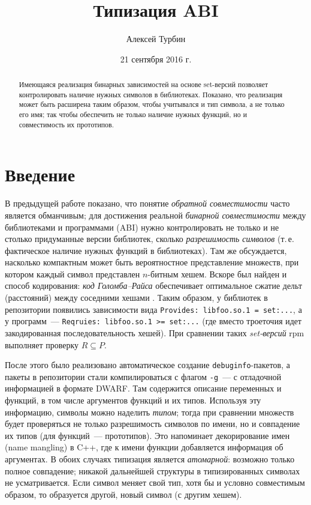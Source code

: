 \documentclass[russian,a4paper,12pt]{article}
\begin{document}
\title{Типизация ABI}
\author{Алексей Турбин}
\date{21 сентября 2016 г.}
\maketitle

\begin{abstract}
Имеющаяся реализация бинарных зависимостей на основе set-версий
позволяет контролировать наличие нужных символов в библиотеках.
Показано, что реализация может быть расширена таким образом,
чтобы учитывался и тип символа, а не только его имя; так чтобы
обеспечить не только наличие нужных функций, но и совместимость
их прототипов.
\end{abstract}

\section{Введение}
В предыдущей %
работе \cite{Tourbin2010} показано, что понятие \textit{обратной совместимости}
часто является обманчивым; для достижения реальной \textit{бинарной
совместимости} между библиотеками и программами (ABI) нужно контролировать
не только и не столько придуманные версии библиотек, сколько \textit{разрешимость символов}
(т.\,е. фактическое наличие нужных функций в библиотеках).  Там же обсуждается, насколько
компактным может быть вероятностное представление множеств, при котором каждый
символ представлен $n$-битным хешем.  Вскоре был найден и способ кодирования:
\textit{код Голомба--Райса} обеспечивает оптимальное сжатие дельт (расстояний)
между соседними хешами \cite{Putze2007}.  Таким образом, у библиотек в репозитории появились
зависимости вида \texttt{Provides: libfoo.so.1~= set:...}, а у программ~---
\texttt{Reqruies: libfoo.so.1~>=~set:...} (где вместо троеточия идет закодированная
последовательность хешей).  При сравнении таких \textit{set-версий} rpm выполняет проверку
$R\subseteq P$.

После этого было реализовано автоматическое создание \verb|debuginfo|-пакетов,
а пакеты в репозитории стали компилироваться с флагом \verb|-g|~--- с отладочной информацией
в формате DWARF.  Там содержится описание переменных и функций, в том числе аргументов
функций и их типов.  Используя эту информацию, символы можно наделить \textit{типом};
тогда при сравнении множеств будет проверяться не только разрешимость символов по имени,
но и совпадение их типов (для функций~--- прототипов).  Это напоминает
декорирование имен (name mangling) в C++, где к имени функции добавляется информация
об аргументах.  В обоих случаях типизация является \textit{атомарной}: возможно только
полное совпадение; никакой дальнейшей структуры в типизированных символах не усматривается.
Если символ меняет свой тип, хотя бы и условно совместимым образом, то образуется другой,
новый символ (с другим хешем).
\end{document}
